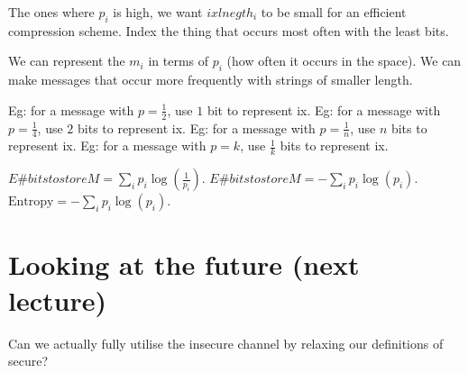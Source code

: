 The ones where $p_i$ is high, we want $ixlnegth_i$ to be small for an efficient compression scheme.
Index the thing that occurs most often with the least bits.

We can represent the  $m_i$ in terms of $p_i$ (how often it occurs in the space).
We can make messages that occur more frequently with strings of smaller length.

Eg: for a message with $p = \frac{1}{2}$, use $1$ bit to represent ix.
Eg: for a message with $p = \frac{1}{4}$, use $2$ bits to represent ix.
Eg: for a message with $p = \frac{1}{n}$, use $n$ bits to represent ix.
Eg: for a message with $p = k$, use $\frac{1}{k}$ bits to represent ix.

$E{\#bits to store M} =  \sum_{i}p_i \log(\frac{1}{p_i})$.
$E{\#bits to store M} = - \sum_{i}p_i \log(p_i)$.
$\text{Entropy} = - \sum_{i}p_i \log(p_i)$.


\section{Looking at the future (next lecture)}

Can we actually fully utilise the insecure channel by relaxing our definitions of secure?

